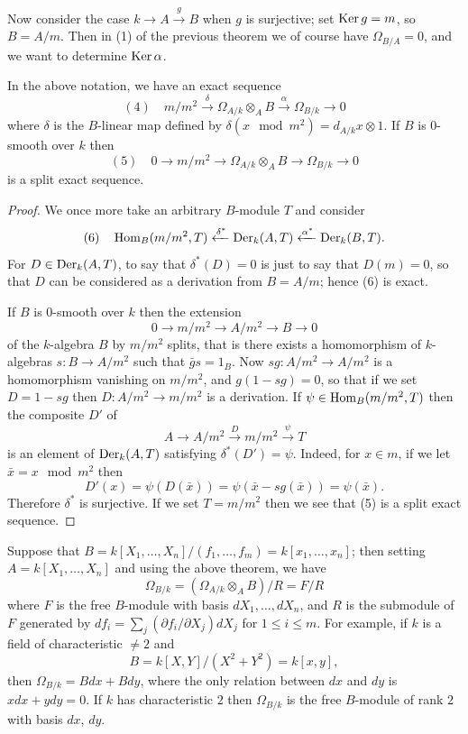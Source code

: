 Now consider the case $k \to A \xrightarrow{g} B$ when $g$ is surjective; set
$\operatorname{Ker} g = m$, so $B = A/m$. Then in (1) of the previous theorem we of course have
$\Omega_{B/A} = 0$, and we want to determine $\operatorname{Ker} \alpha$.

\begin{theorem}\label{thm:25.2}
In the above notation, we have an exact sequence
\[
  (4) \quad m/m^2 \xrightarrow{\delta} \Omega_{A/k} \otimes_A B \xrightarrow{\alpha} \Omega_{B/k} \to 0
\]
where $\delta$ is the $B$-linear map defined by $\delta(x \mod m^2) = d_{A/k}x \otimes 1$. If $B$ is
0-smooth over $k$ then
\[
  (5) \quad 0 \to m/m^2 \to \Omega_{A/k} \otimes_A B \to \Omega_{B/k} \to 0
\]
is a split exact sequence.
\end{theorem}

\begin{proof}
We once more take an arbitrary $B$-module $T$ and consider
\[
  (6) \quad \operatorname{Hom}_B(m/m^2, T) \xleftarrow{\delta^*} \operatorname{Der}_k(A, T) \xleftarrow{\alpha^*} \operatorname{Der}_k(B, T).
\]
For $D \in \operatorname{Der}_k(A, T)$, to say that $\delta^*(D) = 0$ is just to say that $D(m) = 0$, so
that $D$ can be considered as a derivation from $B = A/m$; hence (6) is exact.

If $B$ is 0-smooth over $k$ then the extension
\[
  0 \to m/m^2 \to A/m^2 \to B \to 0
\]
of the $k$-algebra $B$ by $m/m^2$ splits, that is there exists a homomorphism of
$k$-algebras $s\colon B \to A/m^2$ such that $\bar{g}s = 1_B$. Now $sg\colon A/m^2 \to A/m^2$ is a
homomorphism vanishing on $m/m^2$, and $g(1 - sg) = 0$, so that if we set
$D = 1 - sg$ then $D\colon A/m^2 \to m/m^2$ is a derivation. If $\psi \in \operatorname{Hom}_B(m/m^2, T)$
then the composite $D'$ of
\[
  A \to A/m^2 \xrightarrow{D} m/m^2 \xrightarrow{\psi} T
\]
is an element of $\operatorname{Der}_k(A, T)$ satisfying $\delta^*(D') = \psi$. Indeed, for $x \in m$, if we
let $\bar{x} = x \mod m^2$ then
\[
  D'(x) = \psi(D(\bar{x})) = \psi(\bar{x} - sg(\bar{x})) = \psi(\bar{x}).
\]
Therefore $\delta^*$ is surjective. If we set $T = m/m^2$ then we see that (5) is a split
exact sequence.
\end{proof}

\begin{example*}
Suppose that $B = k[X_1, \ldots, X_n]/(f_1, \ldots, f_m) = k[x_1, \ldots, x_n]$; then setting
$A = k[X_1, \ldots, X_n]$ and using the above theorem, we have
\[
  \Omega_{B/k} = (\Omega_{A/k} \otimes_A B)/R = F/R
\]
where $F$ is the free $B$-module with basis $dX_1, \ldots, dX_n$, and $R$ is the
submodule of $F$ generated by $df_i = \sum_j (\partial f_i/\partial X_j)dX_j$ for $1 \le i \le m$.
For example, if $k$ is a field of characteristic $\neq 2$ and
\[
  B = k[X, Y]/(X^2 + Y^2) = k[x, y],
\]
then $\Omega_{B/k} = Bdx + Bdy$, where the only relation between $dx$ and $dy$ is
$xdx + ydy = 0$. If $k$ has characteristic $2$ then $\Omega_{B/k}$ is the free $B$-module of
rank $2$ with basis $dx$, $dy$.
\end{example*}

